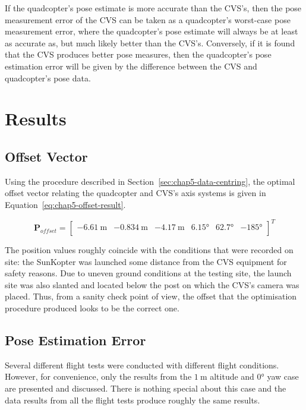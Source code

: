 If the quadcopter's pose estimate is more accurate than the CVS's, then the pose measurement error of the CVS can be taken as a quadcopter's worst-case pose measurement error, where the quadcopter's pose estimate will always be at least as accurate as, but much likely better than the CVS's. Conversely, if it is found that the CVS produces better pose measures, then the quadcopter's pose estimation error will be given by the difference between the CVS and quadcopter's pose data. 

\section{Results}

\subsection{Offset Vector}

Using the procedure described in Section~\ref{sec:chap5-data-centring}, the optimal offset vector relating the quadcopter and CVS's axis systems is given in Equation~\ref{eq:chap5-offset-result}. 

\begin{equation}
  \label{eq:chap5-offset-result}
  \bm{P}_{of\!fset} = 
  \begin{bmatrix}
    \SI{-6.61}{\m} & \SI{-0.834}{\m} & \SI{-4.17}{\m} & \ang{6.15} & \ang{62.7} & \ang{-185} \\
  \end{bmatrix}^T
\end{equation}

The position values roughly coincide with the conditions that were recorded on site: the SunKopter was launched some distance from the CVS equipment for safety reasons. Due to uneven ground conditions at the testing site, the launch site was also slanted and located below the post on which the CVS's camera was placed. Thus, from a sanity check point of view, the offset that the optimisation procedure produced looks to be the correct one. 

\subsection{Pose Estimation Error}

Several different flight tests were conducted with different flight conditions. However, for convenience, only the results from the $\SI{1}{\m}$ altitude and $\ang{0}$ yaw case are presented and discussed. There is nothing special about this case and the data results from all the flight tests produce roughly the same results.  

